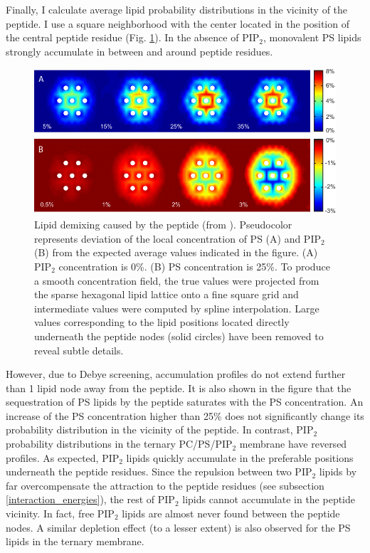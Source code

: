Finally, I calculate average lipid probability distributions in the vicinity of the peptide. I use a square neighborhood with the center located in the position of the central peptide residue (Fig. \ref{fig:lipid_demixing_profiles}). In the absence of PIP$_2$, monovalent PS lipids strongly accumulate in between and around peptide residues. 
\begin{figure}[!ht]
\begin{center}
  \includegraphics{../figures/lipid_demixing_profiles.pdf}
\end{center}
 \caption[Lipid demixing profiles]{Lipid demixing caused by the peptide (from \cite{Kiselev2011}). Pseudocolor represents deviation of the local concentration of PS (A) and PIP$_2$ (B) from the expected average values indicated in the figure. (A) PIP$_2$ concentration is 0\%. (B) PS concentration is 25\%. To produce a smooth concentration field, the true values were projected from the sparse hexagonal lipid lattice onto a fine square grid and intermediate values were computed by spline interpolation. Large values corresponding to the lipid positions located directly underneath the peptide nodes (solid circles) have been removed to reveal subtle details.}
\label{fig:lipid_demixing_profiles}
\end{figure}
However, due to Debye screening, accumulation profiles do not extend further than 1 lipid node away from the peptide. It is also shown in the figure that the sequestration of PS lipids by the peptide saturates with the PS concentration. An increase of the PS concentration higher than 25\% does not significantly change its probability distribution in the vicinity of the peptide. In contrast, PIP$_2$ probability distributions in the ternary PC/PS/PIP$_2$ membrane have reversed profiles. As expected, PIP$_2$ lipids quickly accumulate in the preferable positions underneath the peptide residues. Since the repulsion between two PIP$_2$ lipids by far overcompensate the attraction to the peptide residues (see subsection \ref{interaction_energies}), the rest of PIP$_2$ lipids cannot accumulate in the peptide vicinity. In fact, free PIP$_2$ lipids are almost never found between the peptide nodes. A similar depletion effect (to a lesser extent) is also observed for the PS lipids in the ternary membrane.

